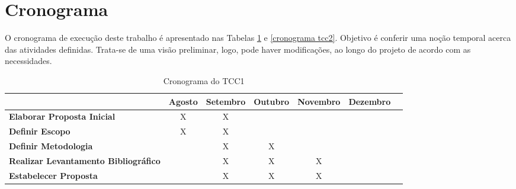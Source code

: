 %
%
\section{Cronograma}
O cronograma de execução deste trabalho é apresentado nas Tabelas \ref{cronograma tcc1} e \ref{cronograma tcc2}. Objetivo é conferir uma noção temporal acerca das atividades definidas. Trata-se de uma visão preliminar, logo, pode haver modificações, ao longo do projeto de acordo com as necessidades.

\begin{table}[h]
\centering
\caption{Cronograma do TCC1}
\label{cronograma tcc1}
\begin{adjustbox}{width=\textwidth}
\begin{tabular}{|l|c|c|c|c|c|c|}
\hline
                                                & \multicolumn{1}{l|}{\textbf{Agosto}} & \multicolumn{1}{l|}{\textbf{Setembro}} & \multicolumn{1}{l|}{\textbf{Outubro}} & \multicolumn{1}{l|}{\textbf{Novembro}} & \multicolumn{1}{l|}{\textbf{Dezembro}} \\ \hline
\textbf{Elaborar Proposta Inicial}              & X                                    & X                                      &                                       &                                        &                                        \\ \hline
\textbf{Definir Escopo}                         & X                                    & X                                      &                                       &                                        &                                        \\ \hline
\textbf{Definir Metodologia}                    &                                      & X                                      & X                                     &                                        &                                        \\ \hline
\textbf{Realizar Levantamento Bibliográfico}    &                                      & X                                      & X                                     & X                                      &                                        \\ \hline
\textbf{Estabelecer Proposta}                   &                                      & X                                      & X                                     & X                                      &                                        \\ \hline

\end{tabular}
\end{adjustbox}
\end{table}
